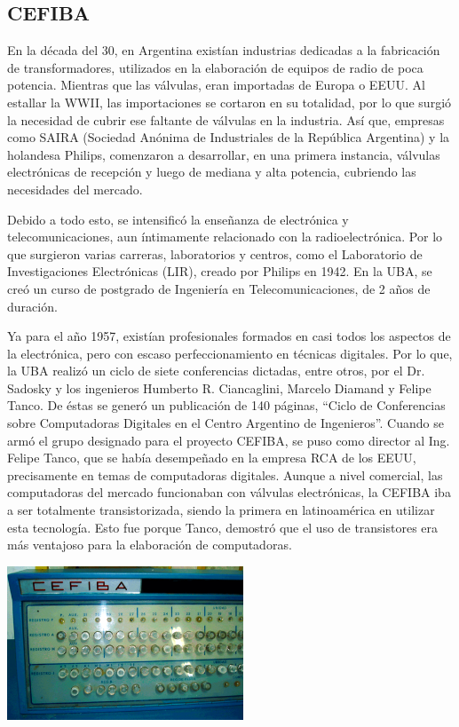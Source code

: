 \documentclass[%
  	final,
%
	notitlepage,
	narroweqnarray,
	inline,
 	twoside,
	]{ieee}
\begin{document}
\subsection*{CEFIBA}

En la d\'ecada del 30, en Argentina exist\'ian industrias dedicadas a la fabricaci\'on de transformadores, utilizados en la elaboraci\'on de equipos de radio de poca potencia. Mientras que las v\'alvulas, eran importadas de Europa o EEUU. Al estallar la WWII, las importaciones se cortaron en su totalidad, por lo que surgi\'o la necesidad de cubrir ese faltante de v\'alvulas en la industria. As\'i que, empresas como SAIRA (Sociedad An\'onima de Industriales de la Rep\'ublica Argentina) y la holandesa Philips, comenzaron a desarrollar, en una primera instancia, v\'alvulas electr\'onicas de recepci\'on y luego de mediana y alta potencia, cubriendo las necesidades del mercado.

Debido a todo esto, se intensific\'o la ense\~nanza de electr\'onica y telecomunicaciones, aun \'intimamente relacionado con la radioelectr\'onica. Por lo que surgieron varias carreras, laboratorios y centros, como el Laboratorio de Investigaciones Electr\'onicas (LIR), creado por Philips en 1942. En la UBA, se cre\'o un curso de postgrado de Ingenier\'ia en Telecomunicaciones, de 2 a\~nos de duraci\'on.

Ya para el a\~no 1957, exist\'ian profesionales formados en casi todos los aspectos de la electr\'onica, pero con escaso perfeccionamiento en t\'ecnicas digitales. Por lo que, la UBA realiz\'o un ciclo de siete conferencias dictadas, entre otros, por el Dr. Sadosky y los ingenieros Humberto R. Ciancaglini, Marcelo Diamand y Felipe Tanco. De \'estas se gener\'o un publicaci\'on de 140 p\'aginas, ``Ciclo de Conferencias sobre Computadoras Digitales en el Centro Argentino de Ingenieros''.
Cuando se arm\'o el grupo designado para el proyecto CEFIBA, se puso como director al Ing. Felipe Tanco, que se hab\'ia desempe\~nado en la empresa RCA de los EEUU, precisamente en temas de computadoras digitales. Aunque a nivel comercial, las computadoras del mercado funcionaban con v\'alvulas electr\'onicas, la CEFIBA iba a ser totalmente transistorizada, siendo la primera en latinoam\'erica en utilizar esta tecnolog\'ia. Esto fue porque Tanco, demostr\'o que el uso de transistores era m\'as ventajoso para la elaboraci\'on de computadoras.\\

\begin{center}\includegraphics[width=200pt, height=130pt]{cefiba.png}\end{center}
\end{document}
